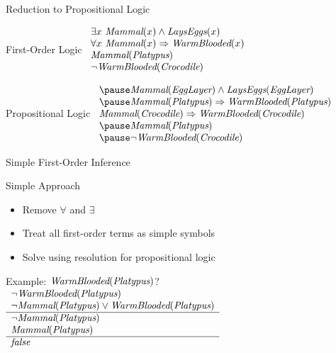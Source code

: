 \documentclass[12pt]{beamer}
\newcommand{\EM}[1]{\mbox{\em#1}}
\newcommand{\limpl}{\Rightarrow}
\begin{document}
\begin{frame}{Reduction to Propositional Logic}
	\begin{block}{First-Order Logic}
		$
		\begin{array}{l}
			\exists x\ \EM{Mammal}(x) \land \EM{LaysEggs}(x) \\
			\forall x\ \EM{Mammal}(x) \limpl \EM{WarmBlooded}(x) \\
			\EM{Mammal}(\EM{Platypus}) \\
			\lnot \EM{WarmBlooded}(\EM{Crocodile})
		\end{array}
		$
	\end{block}
	\pause
	\begin{block}{Propositional Logic}
		$
		\begin{array}{l}
			\pause\EM{Mammal}(\EM{EggLayer}) \land \EM{LaysEggs}(\EM{EggLayer}) \\
			\pause\EM{Mammal}(\EM{Platypus}) \limpl \EM{WarmBlooded}(\EM{Platypus}) \\
			\EM{Mammal}(\EM{Crocodile}) \limpl \EM{WarmBlooded}(\EM{Crocodile}) \\
			\pause\EM{Mammal}(\EM{Platypus}) \\
			\pause\lnot \EM{WarmBlooded}(\EM{Crocodile})
		\end{array}
		$
	\end{block}
\end{frame}
\begin{frame}{Simple First-Order Inference}
	\begin{block}{Simple Approach}
		\begin{itemize}
			\item Remove $\forall$ and $\exists$
			\item Treat all first-order terms as simple symbols
			\item Solve using resolution for propositional logic
		\end{itemize}
	\end{block}
	\pause
	\begin{block}{Example: $\EM{WarmBlooded}(\EM{Platypus})$?}
		$
		\begin{array}{l}
			\lnot\EM{WarmBlooded}(\EM{Platypus}) \\
			\lnot\EM{Mammal}(\EM{Platypus}) \lor \EM{WarmBlooded}(\EM{Platypus}) \\
			\hline
			\lnot\EM{Mammal}(\EM{Platypus}) \\
			\EM{Mammal}(\EM{Platypus}) \\
			\hline
			\EM{false}
		\end{array}
		$
	\end{block}
\end{frame}
\end{document}
